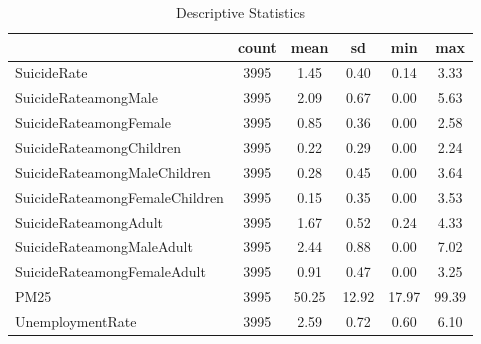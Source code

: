 \begin{table}[htbp]\centering
\def\sym#1{\ifmmode^{#1}\else\(^{#1}\)\fi}
\caption{Descriptive Statistics}
\begin{tabular}{l*{1}{ccccc}}
\hline\hline
            &       count&        mean&          sd&         min&         max\\
\hline
SuicideRate &        3995&        1.45&        0.40&        0.14&        3.33\\
SuicideRateamongMale&        3995&        2.09&        0.67&        0.00&        5.63\\
SuicideRateamongFemale&        3995&        0.85&        0.36&        0.00&        2.58\\
SuicideRateamongChildren&        3995&        0.22&        0.29&        0.00&        2.24\\
SuicideRateamongMaleChildren&        3995&        0.28&        0.45&        0.00&        3.64\\
SuicideRateamongFemaleChildren&        3995&        0.15&        0.35&        0.00&        3.53\\
SuicideRateamongAdult&        3995&        1.67&        0.52&        0.24&        4.33\\
SuicideRateamongMaleAdult&        3995&        2.44&        0.88&        0.00&        7.02\\
SuicideRateamongFemaleAdult&        3995&        0.91&        0.47&        0.00&        3.25\\
PM25        &        3995&       50.25&       12.92&       17.97&       99.39\\
UnemploymentRate&        3995&        2.59&        0.72&        0.60&        6.10\\
\hline\hline
\end{tabular}
\end{table}
